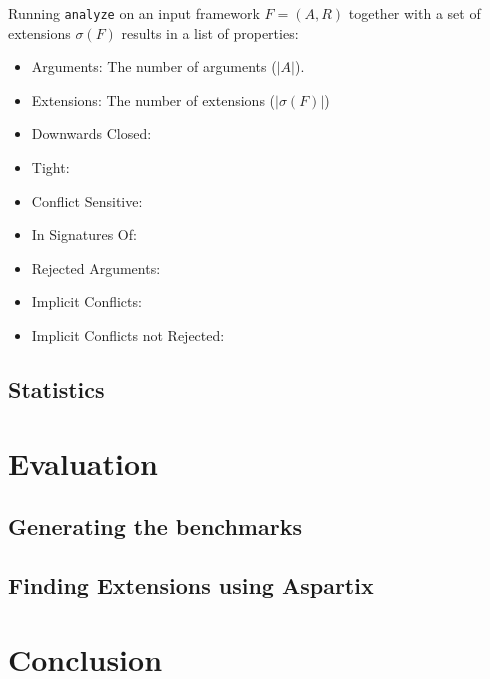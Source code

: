 \documentclass{scrartcl}
\begin{document}
Running \texttt{analyze} on an input framework $F=(A,R)$ together with a set of
extensions $\sigma(F)$ results in a list of properties:
\begin{itemize}
  \item Arguments: The number of arguments ($|A|$).
  \item Extensions:	The number of extensions ($|\sigma(F)|$)
  \item Downwards Closed:	
  \item Tight: 
  \item Conflict Sensitive: 
  \item In Signatures Of: 
  \item Rejected Arguments: 
  \item Implicit Conflicts: 
  \item Implicit Conflicts not Rejected: 
\end{itemize}

\subsection{Statistics}

\section{Evaluation}
\label{evaluation}
\subsection{Generating the benchmarks}
\subsection{Finding Extensions using Aspartix}

\section{Conclusion}
\label{conclusion}

\printbibliography
\end{document}
